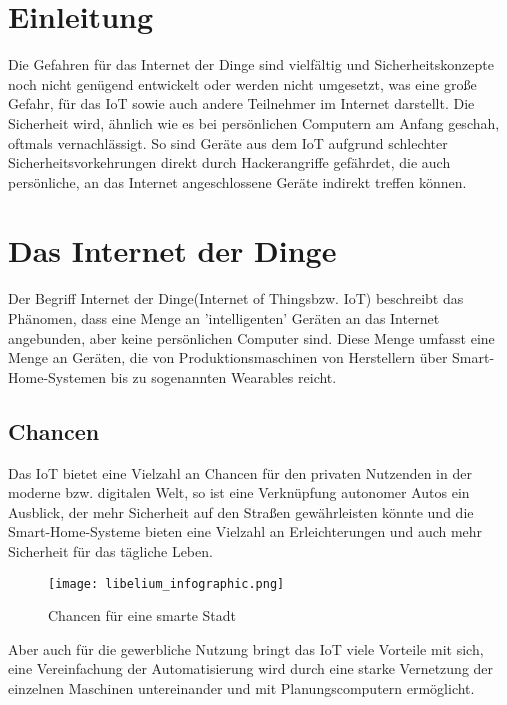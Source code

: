\section{Einleitung}
Die Gefahren für das Internet der Dinge sind vielfältig und Sicherheitskonzepte noch nicht genügend entwickelt oder werden nicht umgesetzt, was eine große Gefahr, für das IoT sowie auch andere Teilnehmer im Internet darstellt.
Die Sicherheit wird, ähnlich wie es bei persönlichen Computern am Anfang geschah, oftmals vernachlässigt. So sind Geräte aus dem IoT aufgrund schlechter Sicherheitsvorkehrungen direkt durch Hackerangriffe gefährdet, die auch persönliche, an das Internet angeschlossene Geräte indirekt treffen können.

\section{Das Internet der Dinge}
Der Begriff \grqq Internet der Dinge\grqq (\grqq Internet of Things\grqq bzw. IoT) beschreibt das Phänomen, dass eine Menge an 'intelligenten' Geräten an das Internet angebunden, aber keine persönlichen Computer sind. Diese Menge umfasst eine Menge an Geräten, die von Produktionsmaschinen von Herstellern über Smart-Home-Systemen bis zu sogenannten Wearables reicht.

\subsection{Chancen}
Das IoT bietet eine Vielzahl an Chancen für den privaten Nutzenden in der moderne bzw. digitalen Welt, so ist eine Verknüpfung autonomer Autos ein Ausblick, der mehr Sicherheit auf den Straßen gewährleisten könnte und die Smart-Home-Systeme bieten eine Vielzahl an Erleichterungen und auch mehr Sicherheit für das tägliche Leben.
\begin{figure}[]
  \texttt{[image: libelium\_infographic.png]}
  \caption{Chancen für eine smarte Stadt}
\end{figure}
Aber auch für die gewerbliche Nutzung bringt das IoT viele Vorteile mit sich, eine Vereinfachung der Automatisierung wird durch eine starke Vernetzung der einzelnen Maschinen untereinander und mit Planungscomputern ermöglicht.

